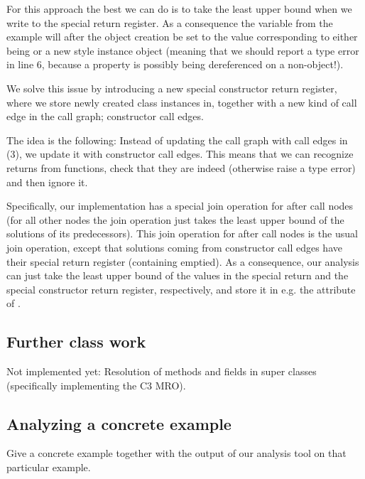 For this approach the best we can do is to take the least upper bound when we write to the special return register. As a consequence the variable  from the example will after the object creation be set to the value corresponding to either being  or a new style instance object (meaning that we should report a type error in line 6, because a property is possibly being dereferenced on a non-object!).

We solve this issue by introducing a new special constructor return register, where we store newly created class instances in, together with a new kind of call edge in the call graph; constructor call edges.

The idea is the following: Instead of updating the call graph with call edges in (3), we update it with constructor call edges. This means that we can recognize returns from  functions, check that they are indeed  (otherwise raise a type error) and then ignore it.

Specifically, our implementation has a special join operation for after call nodes (for all other nodes the join operation just takes the least upper bound of the solutions of its predecessors). This join operation for after call nodes is the usual join operation, except that solutions coming from constructor call edges have their special return register (containing  emptied). As a consequence, our analysis can just take the least upper bound of the values in the special return and the special constructor return register, respectively, and store it in e.g. the attribute  of .


\subsection{Further class work}
Not implemented yet: Resolution of methods and fields in super classes (specifically implementing the C3 MRO).

\subsection{Analyzing a concrete example}
Give a concrete example together with the output of our analysis tool on that particular example.